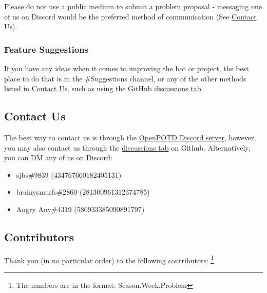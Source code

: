 Please do not use a public medium to submit a problem proposal - messaging one of us on Discord would
 be the preferred method of communication (See \hyperref[sec:contact]{Contact Us}).\medskip

\subsubsection*{Feature Suggestions} 
\label{sec:suggestions}

If you have any ideas when it comes to improving the bot or project, the best place to do that is in the {\selectfont \#Suggestions} channel, or any of the other methods listed in \hyperref[sec:contact]{Contact Us}, such as using the GitHub \href{https://github.com/OpenPOTD/Solutions/discussions}{discussions tab}.\medskip

\subsection*{Contact Us}
\label{sec:contact} 

The best way to contact us is through the \href{https://discord.gg/GsPSSHdhPB}{OpenPOTD Discord server}, 
however, you may also contact us through the \href{https://github.com/OpenPOTD/Solutions/discussions}{discussions tab} on Github.
 Alternatively, you can DM any of us on Discord:

 \begin{itemize}
     \item sjbs\#9839 (434767660182405131)
     \item brainysmurfs\#2860 (281300961312374785)
     \item Angry Any\#4319 (580933385090891797)
 \end{itemize}
 \medskip

\subsection*{Contributors}
\label{sec:contributors}

Thank you (in no particular order) to the following contributors:
\footnote{The numbers are in the format: Season.Week.Problem}\medskip


